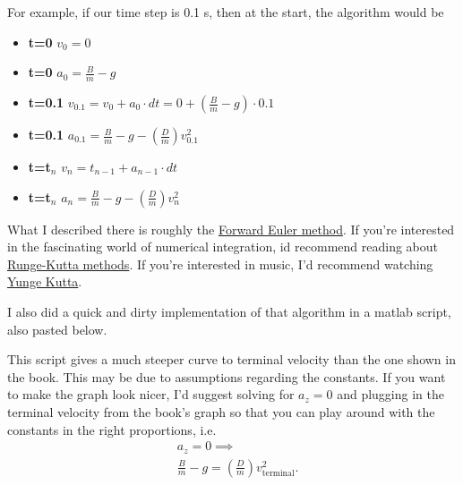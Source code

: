 \documentclass{article}
\begin{document}
For example, if our time step is 0.1 s, then at the start, the algorithm would be 
\begin{itemize}
	\item \textbf{t=0   \quad   }    $v_0=0$
	\item \textbf{t=0   \quad   }    $a_0=\frac{B}{m} - g$
	\item \textbf{t=0.1\quad}  $v_{0.1}=v_0+a_0\cdot dt = 0 + (\frac{B}{m} - g)\cdot 0.1$
	\item \textbf{t=0.1\quad}  $a_{0.1}=\frac{B}{m} - g - \left(\frac{D}{m}\right) v_{0.1}^2$
	\item \textbf{t=t$_n$   \quad   }    $v_n = t_{n-1} + a_{n-1}\cdot dt$
	\item \textbf{t=t$_n$   \quad   }    $a_{n}=\frac{B}{m} - g - \left(\frac{D}{m}\right) v_{n}^2  $
\end{itemize}



What I described there is roughly the \href{https://en.wikipedia.org/wiki/Euler\_method}{Forward Euler method}. If you're interested in the fascinating world of numerical integration, id recommend reading about \href{https://en.wikipedia.org/wiki/Runge%E2%80%93Kutta_methods}{Runge-Kutta methods}. If you're interested in music, I'd recommend watching \href{https://www.youtube.com/watch?v=eJxZQ6f37zY&t=2s}{Yunge Kutta}.

I also did a quick and dirty implementation of that algorithm in a matlab script, also pasted below. 

This script gives a much steeper curve to terminal velocity than the one shown in the book. This may be due to assumptions regarding the constants. If you want to make the graph look nicer, I'd suggest solving for $a_z = 0$ and plugging in the terminal velocity from the book's graph so that you can play around with the constants in the right proportions, i.e.
\begin{equation}
	\begin{split}
	&a_z = 0\implies\\
	&\frac{B}{m} - g = \left(\frac{D}{m}\right)v_{\text{terminal}}^2.
	\end{split}
\end{equation}
\end{document}
